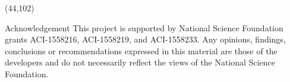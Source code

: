 \documentclass[final]{beamer}
\begin{document}
\begin{frame}{}
\begin{textblock}{38.0}(44,102)
\begin{block}{Acknowledgement}
This project is supported by National Science Foundation grants ACI-1558216, ACI-1558219, and ACI-1558233. Any opinions, findings, conclusions or recommendations expressed in this material are those of the developers and do not necessarily reflect the views of the National Science Foundation.
\end{block}
\end{textblock}




\end{frame}
\end{document}

